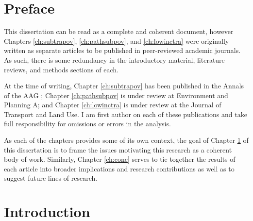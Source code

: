 \documentclass[11 pt, letterpaper]{report}
\begin{document}
\newpage



\listoftables



\hypersetup{
	colorlinks=true,
	linkcolor=red,
	citecolor=blue,
	urlcolor=blue
}



\newpage


\chapter*{Preface}


This dissertation can be read as a complete and coherent document, however Chapters \ref{ch:subtrapov}, \ref{ch:pathsubpov}, and \ref{ch:lowinctra} were originally written as separate articles to be published in peer-reviewed academic journals. As such, there is some redundancy in the introductory material, literature reviews, and methods sections of each. 

At the time of writing, Chapter \ref{ch:subtrapov} has been published in the Annals of the AAG \cite{allen_suburbanization_2021}; Chapter \ref{ch:pathsubpov} is under review at Environment and Planning A; and Chapter \ref{ch:lowinctra} is under review at the Journal of Transport and Land Use. I am first author on each of these publications and take full responsibility for omissions or errors in the analysis. 

As each of the chapters provides some of its own context, the goal of Chapter \ref{ch:intro} of this dissertation is to frame the issues motivating this research as a coherent body of work. Similarly, Chapter \ref{ch:conc} serves to tie together the results of each article into broader implications and research contributions as well as to suggest future lines of research. 



\newpage


\renewcommand{\thepage}{\arabic{page}}%
\setcounter{page}{1}



\chapter{{Introduction}}


\label{ch:intro}
\end{document}
